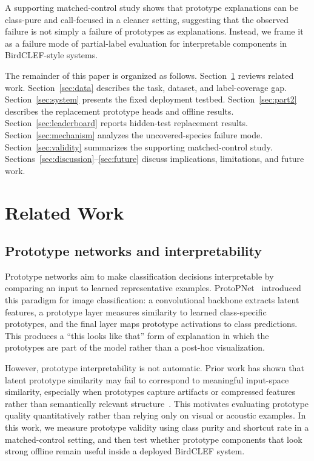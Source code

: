 \documentclass{ceurart}
\begin{document}
A supporting matched-control study shows that prototype explanations can be class-pure and call-focused in a cleaner setting, suggesting that the observed failure is not simply a failure of prototypes as explanations. Instead, we frame it as a failure mode of partial-label evaluation for interpretable components in BirdCLEF-style systems.

The remainder of this paper is organized as follows. Section~\ref{sec:related} reviews related work. Section~\ref{sec:data} describes the task, dataset, and label-coverage gap. Section~\ref{sec:system} presents the fixed deployment testbed. Section~\ref{sec:part2} describes the replacement prototype heads and offline results. Section~\ref{sec:leaderboard} reports hidden-test replacement results. Section~\ref{sec:mechanism} analyzes the uncovered-species failure mode. Section~\ref{sec:validity} summarizes the supporting matched-control study. Sections~\ref{sec:discussion}--\ref{sec:future} discuss implications, limitations, and future work.

\section{Related Work}
\label{sec:related}

\subsection{Prototype networks and interpretability}

Prototype networks aim to make classification decisions interpretable by comparing an input to learned representative examples. ProtoPNet~\cite{chen2019protopnet} introduced this paradigm for image classification: a convolutional backbone extracts latent features, a prototype layer measures similarity to learned class-specific prototypes, and the final layer maps prototype activations to class predictions. This produces a ``this looks like that'' form of explanation in which the prototypes are part of the model rather than a post-hoc visualization.

However, prototype interpretability is not automatic. Prior work has shown that latent prototype similarity may fail to correspond to meaningful input-space similarity, especially when prototypes capture artifacts or compressed features rather than semantically relevant structure~\cite{hoffmann2021looks}. This motivates evaluating prototype quality quantitatively rather than relying only on visual or acoustic examples. In this work, we measure prototype validity using class purity and shortcut rate in a matched-control setting, and then test whether prototype components that look strong offline remain useful inside a deployed BirdCLEF system.
\end{document}
